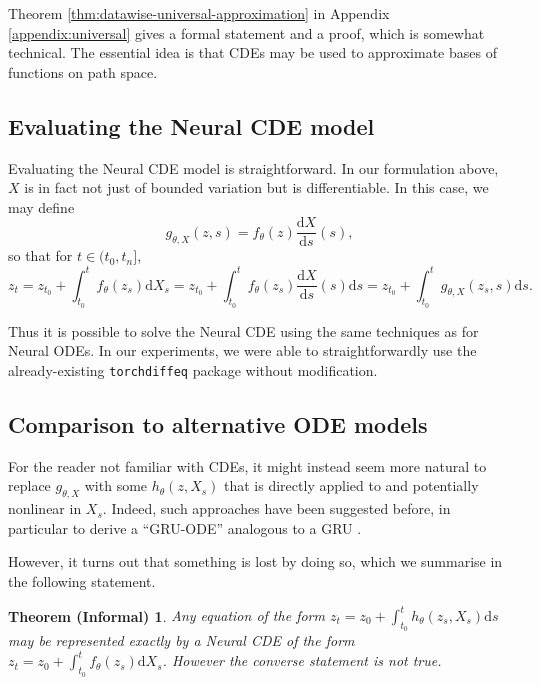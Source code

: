 \documentclass{article}
\theoremstyle{plain}
\newtheorem*{thm-informal}{Theorem (Informal)}
\theoremstyle{definition}
\begin{document}
	Theorem \ref{thm:datawise-universal-approximation} in Appendix \ref{appendix:universal} gives a formal statement and a proof, which is somewhat technical. The essential idea is that CDEs may be used to approximate bases of functions on path space.
	
	\subsection{Evaluating the Neural CDE model}\label{subsection:evaluate}
	Evaluating the Neural CDE model is straightforward. In our formulation above, $X$ is in fact not just of bounded variation but is differentiable. In this case, we may define
	\begin{equation}\label{eq:g-theta-x}
	g_{\theta, X}(z, s) = f_\theta(z) \frac{\mathrm{d}X}{\mathrm{d}s}(s),
	\end{equation}
	so that for $t \in (t_0, t_n]$,
	\begin{equation}\label{eq:ncde-to-node}
	z_t = z_{t_0} + \int_{t_0}^t f_\theta(z_s) \mathrm{d} X_s = z_{t_0} + \int_{t_0}^t f_\theta(z_s) \frac{\mathrm{d}X}{\mathrm{d}s}(s) \mathrm{d}s = z_{t_0} + \int_{t_0}^t g_{\theta, X}(z_s, s) \mathrm{d}s.
	\end{equation}
	
	Thus it is possible to solve the Neural CDE using the same techniques as for Neural ODEs. %
	In our experiments, we were able to straightforwardly use the already-existing \texttt{torchdiffeq} package \cite{torchdiffeq} without modification.
	
	\subsection{Comparison to alternative ODE models}\label{section:contrnn}
	For the reader not familiar with CDEs, it might instead seem more natural to replace $g_{\theta, X}$ with some $h_\theta(z, X_s)$ that is directly applied to and potentially nonlinear in $X_s$. Indeed, such approaches have been suggested before, in particular to derive a ``GRU-ODE'' analogous to a GRU \cite{gru-ode-bayes, gruode}.
	
	However, it turns out that something is lost by doing so, which we summarise in the following statement.
	
	\begin{thm-informal}
	Any equation of the form $z_t = z_0 + \int_{t_0}^t h_\theta(z_s, X_s) \mathrm{d}s$ may be represented exactly by a Neural CDE of the form $z_t = z_0 + \int_{t_0}^t f_\theta(z_s) \mathrm{d}X_s$. However the converse statement is not true.
	\end{thm-informal}
	
\end{document}
